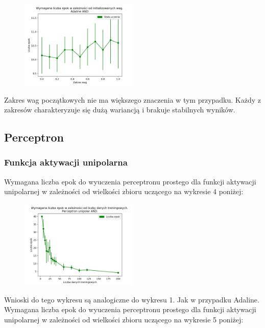 \documentclass{article}
\begin{document}
	\begin{figure}[h]

		\centering
		\caption{}
		\includegraphics[width=0.5\textwidth]{epoki_wagi_adaline_and.png}
		
	\end{figure}   
	Zakres wag początkowych nie ma większego znaczenia w tym przypadku. Każdy z zakresów charakteryzuje się dużą wariancją i brakuje stabilnych wyników.
\newpage
	\subsection{Perceptron}
	\subsubsection{Funkcja aktywacji unipolarna}
	Wymagana liczba epok do wyuczenia perceptronu prostego dla funkcji aktywacji unipolarnej w zależności od wielkości zbioru uczącego na wykresie 4 poniżej:
	\begin{figure}[h]
		\centering
		\caption{}
		\includegraphics[width=0.5\textwidth]{epoki_dane_perceptron_unipolar_and.png}
	\end{figure}
	
	Wnioski do tego wykresu są analogiczne do wykresu 1. Jak w przypadku Adaline.\\[0.5cm]
	
	Wymagana liczba epok do wyuczenia perceptronu prostego dla funkcji aktywacji unipolarnej w zależności od wielkości zbioru uczącego na wykresie 5 poniżej:
	
\end{document}
